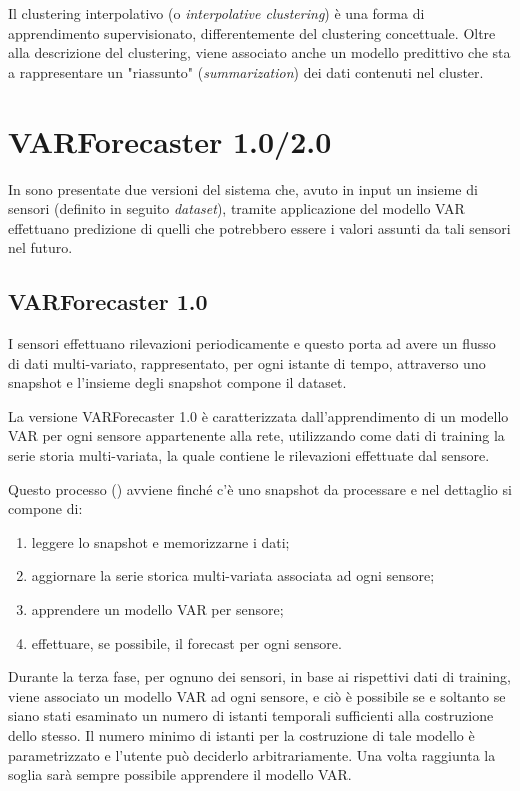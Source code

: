 \documentclass[12pt,a4paper,twoside,openright]{book}
\begin{document}
Il clustering interpolativo (o \textit{interpolative clustering}) è una forma di apprendimento supervisionato, differentemente del clustering concettuale. Oltre alla descrizione del clustering, viene associato anche un modello predittivo che sta a rappresentare un "riassunto" (\textit{summarization}) dei dati contenuti nel cluster.
\newpage
\section{VARForecaster 1.0/2.0}
In \cite{donato} sono presentate due versioni del sistema che, avuto in input un insieme di sensori (definito in seguito \textit{dataset}), tramite applicazione del modello VAR effettuano predizione di quelli che potrebbero essere i valori assunti da tali sensori nel futuro. 


\subsection{VARForecaster 1.0}
I sensori effettuano rilevazioni periodicamente e questo porta ad avere un flusso di dati multi-variato, rappresentato, per ogni istante di tempo, attraverso uno snapshot e l'insieme degli snapshot compone il dataset. 

La versione VARForecaster 1.0 è caratterizzata dall'apprendimento di un modello VAR per ogni sensore appartenente alla rete, utilizzando come dati di training la serie storia multi-variata, la quale contiene le rilevazioni effettuate dal sensore.

Questo processo (\cite{donato}) avviene finché c'è uno snapshot da processare e nel dettaglio si compone di:
\begin{enumerate}
\item leggere lo snapshot e memorizzarne i dati;
\item aggiornare la serie storica multi-variata associata ad ogni sensore;
\item apprendere un modello VAR per sensore;
\item effettuare, se possibile, il forecast per ogni sensore.
\end{enumerate}
Durante la terza fase, per ognuno dei sensori, in base ai rispettivi dati di training, viene associato un modello VAR ad ogni sensore, e ciò è possibile se e soltanto se siano stati esaminato un numero di istanti temporali sufficienti alla costruzione dello stesso. Il numero minimo di istanti per la costruzione di tale modello è parametrizzato e l'utente può deciderlo arbitrariamente. Una volta raggiunta la soglia sarà sempre possibile apprendere il modello VAR.
\end{document}
